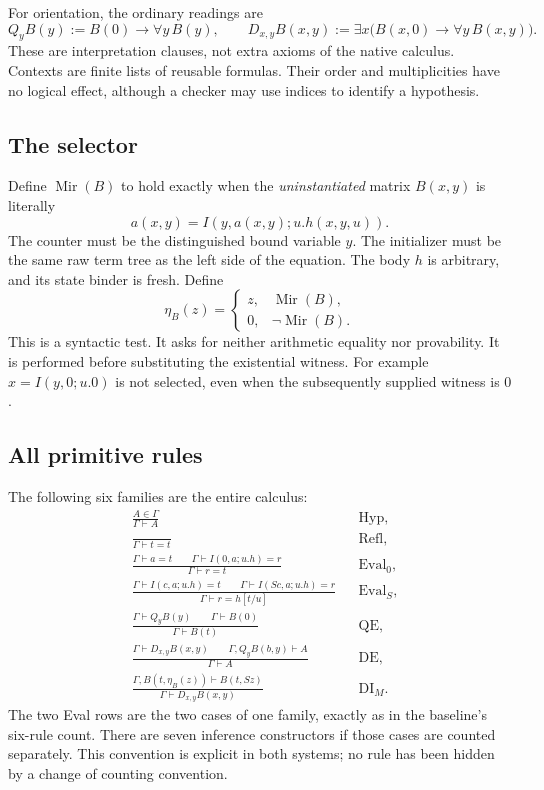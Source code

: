 \documentclass[11pt]{article}
\theoremstyle{definition}\newtheorem{definition}[theorem]{Definition}
\newcommand{\Mir}{\operatorname{Mir}}
\begin{document}
For orientation, the ordinary readings are
\[
 Q_yB(y) := B(0)\to\forall y\,B(y),
 \qquad
 D_{x,y}B(x,y) :=
 \exists x\bigl(B(x,0)\to\forall y\,B(x,y)\bigr).
\]
These are interpretation clauses, not extra axioms of the native
calculus. Contexts are finite lists of reusable formulas. Their order
and multiplicities have no logical effect, although a checker may use
indices to identify a hypothesis.

\subsection{The selector}
Define $\Mir(B)$ to hold exactly when the \emph{uninstantiated} matrix
$B(x,y)$ is literally
\[
             a(x,y)=I(y,a(x,y);u.h(x,y,u)).             \tag{M}
\]
The counter must be the distinguished bound variable $y$. The
initializer must be the same raw term tree as the left side of the
equation. The body $h$ is arbitrary, and its state binder is fresh.
Define
\[
 \eta_B(z)=\begin{cases}z,&\Mir(B),\\0,&\neg\Mir(B).\end{cases}
\]
This is a syntactic test. It asks for neither arithmetic equality nor
provability. It is performed before substituting the existential
witness. For example $x=I(y,0;u.0)$ is not selected, even when the
subsequently supplied witness is $0$.

\subsection{All primitive rules}
The following six families are the entire calculus:
\begin{align*}
 &\frac{A\in\Gamma}{\Gamma\vdash A}
       &&\mathrm{Hyp},\\[5pt]
 &\frac{}{\Gamma\vdash t=t}
       &&\mathrm{Refl},\\[5pt]
 &\frac{\Gamma\vdash a=t\qquad
         \Gamma\vdash I(0,a;u.h)=r}
        {\Gamma\vdash r=t}
       &&\mathrm{Eval}_0,\\[5pt]
 &\frac{\Gamma\vdash I(c,a;u.h)=t\qquad
         \Gamma\vdash I(Sc,a;u.h)=r}
        {\Gamma\vdash r=h[t/u]}
       &&\mathrm{Eval}_S,\\[5pt]
 &\frac{\Gamma\vdash Q_yB(y)\qquad\Gamma\vdash B(0)}
        {\Gamma\vdash B(t)}
       &&\mathrm{QE},\\[5pt]
 &\frac{\Gamma\vdash D_{x,y}B(x,y)\qquad
         \Gamma,Q_yB(b,y)\vdash A}
        {\Gamma\vdash A}
       &&\mathrm{DE},\\[5pt]
 &\frac{\Gamma,B(t,\eta_B(z))\vdash B(t,Sz)}
        {\Gamma\vdash D_{x,y}B(x,y)}
       &&\mathrm{DI}_{M}.
\end{align*}
The two Eval rows are the two cases of one family, exactly as in the
baseline's six-rule count. There are seven inference constructors if
those cases are counted separately. This convention is explicit in both
systems; no rule has been hidden by a change of counting convention.
\end{document}

